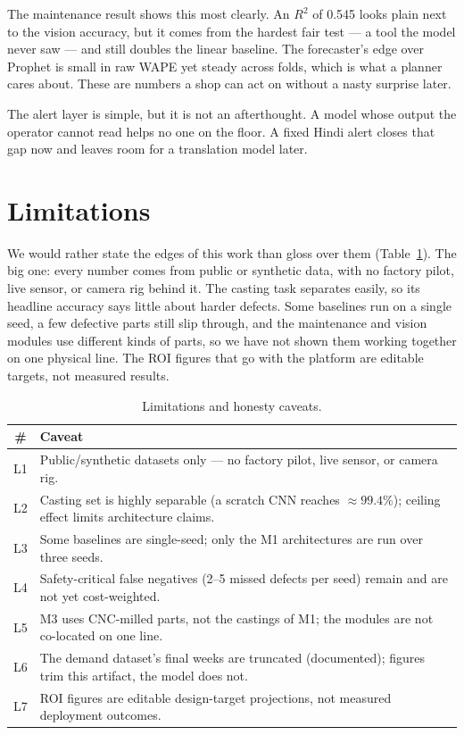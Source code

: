 \documentclass[12pt]{article}
\begin{document}
The maintenance result shows this most clearly. An $R^2$ of 0.545 looks plain next
to the vision accuracy, but it comes from the hardest fair test --- a tool the model
never saw --- and still doubles the linear baseline. The forecaster's edge over
Prophet is small in raw WAPE yet steady across folds, which is what a planner cares
about. These are numbers a shop can act on without a nasty surprise later.

The alert layer is simple, but it is not an afterthought. A model whose output the
operator cannot read helps no one on the floor. A fixed Hindi alert closes that gap
now and leaves room for a translation model later.

\section{Limitations}

We would rather state the edges of this work than gloss over them
(Table~\ref{tab:limits}). The big one: every number comes from public or synthetic
data, with no factory pilot, live sensor, or camera rig behind it. The casting task
separates easily, so its headline accuracy says little about harder defects. Some
baselines run on a single seed, a few defective parts still slip through, and the
maintenance and vision modules use different kinds of parts, so we have not shown
them working together on one physical line. The ROI figures that go with the
platform are editable targets, not measured results.

\begin{table}[H]
\caption{Limitations and honesty caveats.}
\label{tab:limits}
\centering
\small
\begin{tabular}{@{}cp{11.0cm}@{}}
\toprule
\# & Caveat \\
\midrule
L1 & Public/synthetic datasets only --- no factory pilot, live sensor, or camera rig. \\
L2 & Casting set is highly separable (a scratch CNN reaches $\approx99.4\%$); ceiling effect limits architecture claims. \\
L3 & Some baselines are single-seed; only the M1 architectures are run over three seeds. \\
L4 & Safety-critical false negatives (2--5 missed defects per seed) remain and are not yet cost-weighted. \\
L5 & M3 uses CNC-milled parts, not the castings of M1; the modules are not co-located on one line. \\
L6 & The demand dataset's final weeks are truncated (documented); figures trim this artifact, the model does not. \\
L7 & ROI figures are editable design-target projections, not measured deployment outcomes. \\
\bottomrule
\end{tabular}
\end{table}
\end{document}
